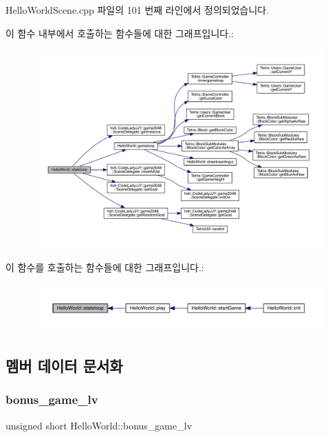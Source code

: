 Hello\+World\+Scene.\+cpp 파일의 101 번째 라인에서 정의되었습니다.

이 함수 내부에서 호출하는 함수들에 대한 그래프입니다.\+:
\nopagebreak
\begin{figure}[H]
\begin{center}
\leavevmode
\includegraphics[width=350pt]{class_hello_world_a4ab71b15b7e362af143d2a539e39a538_cgraph}
\end{center}
\end{figure}
이 함수를 호출하는 함수들에 대한 그래프입니다.\+:
\nopagebreak
\begin{figure}[H]
\begin{center}
\leavevmode
\includegraphics[width=350pt]{class_hello_world_a4ab71b15b7e362af143d2a539e39a538_icgraph}
\end{center}
\end{figure}


\subsection{멤버 데이터 문서화}
\mbox{\label{class_hello_world_a7832a6ec52f92f460f3fc352a06412f4}} 
\subsubsection{\texorpdfstring{bonus\+\_\+game\+\_\+lv}{bonus\_game\_lv}}
{\footnotesize\ttfamily unsigned short Hello\+World\+::bonus\+\_\+game\+\_\+lv\hspace{0.3cm}{\ttfamily [protected]}}



